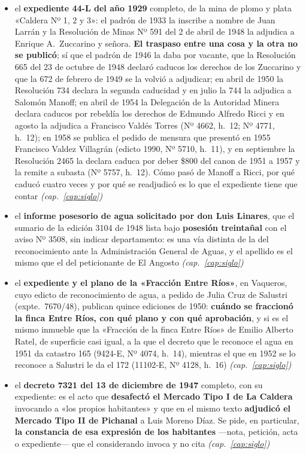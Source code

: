 \begin{itemize}[leftmargin=*]
\item el \textbf{expediente 44-L del año 1929} completo, de la mina de plomo y plata «Caldera Nº 1, 2 y 3»: el padrón de 1933 la inscribe a nombre de Juan Larrán y la Resolución de Minas Nº 591 del 2 de abril de 1948 la adjudica a Enrique A.\ Zuccarino y señora. \textbf{El traspaso entre una cosa y la otra no se publicó}; sí que el padrón de 1946 la daba por vacante, que la Resolución 665 del 23 de octubre de 1948 declaró caducos los derechos de los Zuccarino y que la 672 de febrero de 1949 se la volvió a adjudicar; en abril de 1950 la Resolución 734 declara la segunda caducidad y en julio la 744 la adjudica a Salomón Manoff; en abril de 1954 la Delegación de la Autoridad Minera declara caducos por rebeldía los derechos de Edmundo Alfredo Ricci y en agosto la adjudica a Francisco Valdés Torres (Nº 4662, h.\ 12; Nº 4771, h.\ 12); en 1958 se publica el pedido de mensura que presentó en 1955 Francisco Valdez Villagrán (edicto 1990, Nº 5710, h.\ 11), y en septiembre la Resolución 2465 la declara caduca por deber \$800 del canon de 1951 a 1957 y la remite a subasta (Nº 5757, h.\ 12). Cómo pasó de Manoff a Ricci, por qué caducó cuatro veces y por qué se readjudicó es lo que el expediente tiene que contar \textit{(cap.\ \ref{cap:siglo})}
\item el \textbf{informe posesorio de agua solicitado por don Luis Linares}, que el sumario de la edición 3104 de 1948 lista bajo \textbf{posesión treintañal} con el aviso Nº 3508, sin indicar departamento: es una vía distinta de la del reconocimiento ante la Administración General de Aguas, y el apellido es el mismo que el del peticionante de El Angosto \textit{(cap.\ \ref{cap:siglo})}
\item el \textbf{expediente y el plano de la «Fracción Entre Ríos»}, en Vaqueros, cuyo edicto de reconocimiento de agua, a pedido de Julia Cruz de Salustri (expte.\ 7670/48), publican quince ediciones de 1950: \textbf{cuándo se fraccionó la finca Entre Ríos, con qué plano y con qué aprobación}, y si es el mismo inmueble que la «Fracción de la finca Entre Ríos» de Emilio Alberto Ratel, de superficie casi igual, a la que el decreto que le reconoce el agua en 1951 da catastro 165 (9424-E, Nº 4074, h.\ 14), mientras el que en 1952 se lo reconoce a Salustri le da el 172 (11102-E, Nº 4128, h.\ 16) \textit{(cap.\ \ref{cap:siglo})}
\item el \textbf{decreto 7321 del 13 de diciembre de 1947} completo, con su expediente: es el acto que \textbf{desafectó el Mercado Tipo I de La Caldera} invocando a «los propios habitantes» y que en el mismo texto \textbf{adjudicó el Mercado Tipo II de Pichanal} a Luis Moreno Díaz. Se pide, en particular, \textbf{la constancia de esa expresión de los habitantes} ---nota, petición, acta o expediente--- que el considerando invoca y no cita \textit{(cap.\ \ref{cap:siglo})}

\end{itemize}
